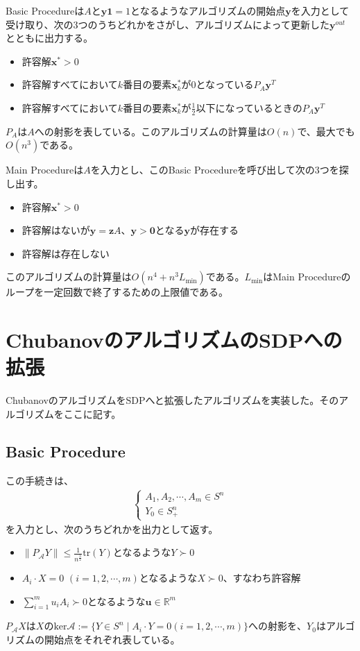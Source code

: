 Basic Procedureは$A$と$\mathbf{y} \mathbf{1} = 1$となるようなアルゴリズムの開始点$\mathbf{y}$を入力として受け取り、次の3つのうちどれかをさがし、アルゴリズムによって更新した$\mathbf{y}^{out}$とともに出力する。
\begin{itemize}
  \item 許容解$\mathbf{x}^* > 0$
  \item 許容解すべてにおいて$k$番目の要素$\mathbf{x}_k^*$が$0$となっている$P_A \mathbf{y}^T$
  \item 許容解すべてにおいて$k$番目の要素$\mathbf{x}_k^*$が$\frac{1}{2}$以下になっているときの$P_A \mathbf{y}^T$
\end{itemize}
$P_A$は$A$への射影を表している。このアルゴリズムの計算量は$O(n)$で、最大でも$O(n^3)$である。

Main Procedureは$A$を入力とし、このBasic Procedureを呼び出して次の3つを探し出す。
\begin{itemize}
  \item 許容解$\mathbf{x}^* > 0$
  \item 許容解はないが$\mathbf{y} = \mathbf{z} A、\mathbf{y} > \mathbf{0}$となる$\mathbf{y}$が存在する
  \item 許容解は存在しない
\end{itemize}
このアルゴリズムの計算量は$O(n^4 + n^3 L_{\text{min}})$である。$L_{\text{min}}$はMain Procedureのループを一定回数で終了するための上限値である。

\section{ChubanovのアルゴリズムのSDPへの拡張}
ChubanovのアルゴリズムをSDPへと拡張したアルゴリズムを実装した。そのアルゴリズムをここに記す。
\subsection{Basic Procedure}
この手続きは、
\begin{align*}
  \left\{
    \begin{array}{l}
      A_1, A_2, \cdots, A_m \in S^n\\
      Y_0 \in S_+^n
    \end{array}
  \right.
\end{align*}
を入力とし、次のうちどれかを出力として返す。
\begin{itemize}
  \item $\displaystyle{\|P_\mathcal{A} Y\| \leq \frac{1}{n^{\frac{3}{2}}} \mathrm{tr}(Y)}$となるような$Y \succ 0$
  \item $A_i \cdot X = 0 \,\, (i = 1, 2, \cdots, m)$となるような$X \succ 0$、すなわち許容解
  \item $\displaystyle{\sum_{i = 1}^m u_i A_i \succ 0}$となるような$\mathbf{u} \in \mathbb{R}^m$
\end{itemize}
$P_\mathcal{A} X$は$X$の$\mathrm{ker}\mathcal{A} := \{Y \in S^n \mid A_i \cdot Y = 0 (i = 1, 2, \cdots, m)\}$への射影を、$Y_0$はアルゴリズムの開始点をそれぞれ表している。

